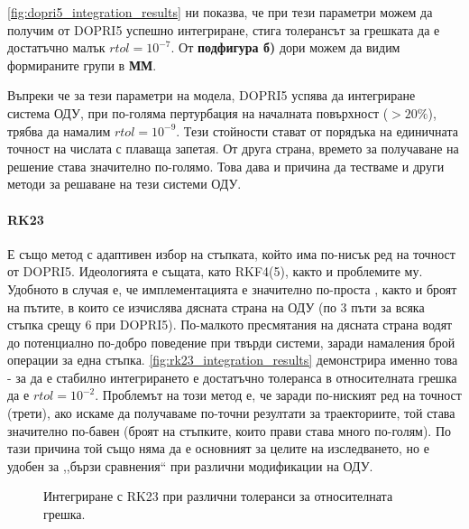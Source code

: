 \autoref{fig:dopri5_integration_results} ни показва, че при тези параметри можем да получим от DOPRI5 успешно интегриране, стига толерансът за грешката да е достатъчно малък $rtol  = 10^{-7}$. От \textbf{подфигура б)} дори можем да видим формираните групи в \textbf{ММ}.

Въпреки че за тези параметри на модела, DOPRI5 успява да интегриране система ОДУ, при по-голяма пертурбация на началната повърхност ($ > 20\%$), трябва да намалим $rtol = 10^{-9}$. Тези стойности стават от порядъка на единичната точност на числата с плаваща запетая. От друга страна, времето за получаване на решение става значително по-голямо. Това дава и причина да тестваме и други методи за решаване на тези системи ОДУ.

\paragraph{RK23} Е също метод с адаптивен избор на стъпката, който има по-нисък ред на точност от DOPRI5. Идеологията е същата, като RKF4(5), както и проблемите му. Удобното в случая е, че имплементацията е значително по-проста \cite{RK23GH}, както и броят на пътите, в които се изчислява дясната страна на ОДУ (по 3 пъти за всяка стъпка срещу 6 при DOPRI5). По-малкото пресмятания на дясната страна водят до потенциално по-добро поведение при твърди системи, заради намаления брой операции за една стъпка. \autoref{fig:rk23_integration_results} демонстрира именно това - за да е стабилно интегрирането е достатъчно толеранса в относителната грешка да е $rtol = 10^{-2}$. Проблемът на този метод е, че заради по-ниският ред на точност (трети), ако искаме да получаваме по-точни резултати за траекториите, той става значително по-бавен (броят на стъпките, които прави става много по-голям). По тази причина той също няма да е основният за целите на изследването, но е удобен за ,,бързи сравнения`` при различни модификации на ОДУ.
\begin{figure}[hbpt]
    \centering
    \caption{Интегриране с RK23 при различни толеранси за относителната грешка.}
    \label{fig:rk23_integration_results}
\end{figure}

